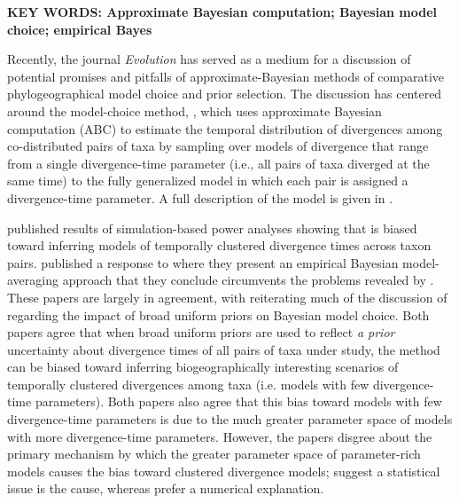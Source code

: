 \documentclass[letterpaper,12pt]{article}
\begin{document}
\begin{linenumbers}
{    \vspace{12pt}
    \noindent\textbf{KEY WORDS: Approximate Bayesian computation; Bayesian
        model choice; empirical Bayes} 

}

\newpage

Recently, the journal \emph{Evolution} has served as a medium for a discussion
of potential promises and pitfalls of approximate-Bayesian methods of
comparative phylogeographical model choice and prior selection.
The discussion has centered around the model-choice method, \msb
\citep{Huang2011}, which uses approximate Bayesian computation (ABC) to
estimate the temporal distribution of divergences among co-distributed pairs of
taxa by sampling over models of divergence that range from a single
divergence-time parameter (i.e., all pairs of taxa diverged at the same time)
to the fully generalized model in which each pair is assigned a divergence-time
parameter.
A full description of the model is given in \citet{Oaks2012}.

\citet{Oaks2012} published results of simulation-based power analyses showing
that \msb is biased toward inferring models of temporally clustered divergence
times across taxon pairs.
\citet{Hickerson2013} published a response to \citet{Oaks2012} where they
present an empirical Bayesian model-averaging approach that they conclude
circumvents the problems revealed by \citet{Oaks2012}.
These papers are largely in agreement, with \citet{Hickerson2013} reiterating
much of the discussion of \citet{Oaks2012} regarding the impact of broad
uniform priors on Bayesian model choice.
Both papers agree that when broad uniform priors are used to reflect \emph{a
prior} uncertainty about divergence times of all pairs of taxa under study,
the method can be biased toward inferring biogeographically interesting
scenarios of temporally clustered divergences among taxa (i.e. models with few
divergence-time parameters).
Both papers also agree that this bias toward models with few divergence-time
parameters is due to the much greater parameter space of models with more
divergence-time parameters.
However, the papers disgree about the primary mechanism by which the greater
parameter space of parameter-rich models causes the bias toward clustered
divergence models;
\citet{Oaks2012} suggest a statistical issue is the cause, whereas
\citep{Hickerson2013} prefer a numerical explanation.


\end{linenumbers}
\end{document}
